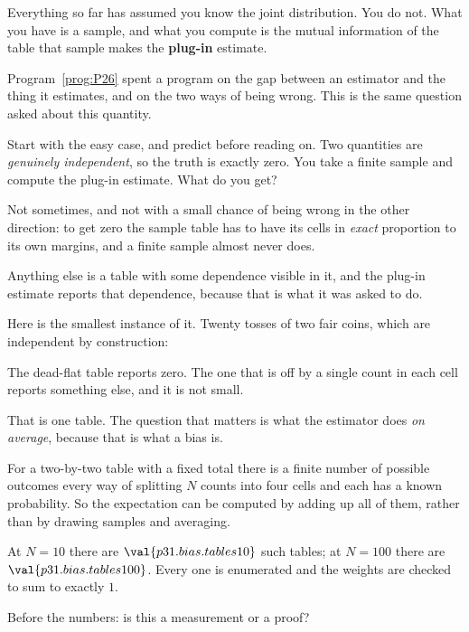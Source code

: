 \begin{fr}
Everything so far has assumed you know the joint distribution. You do not.
What you have is a sample, and what you compute is the mutual information of
the table that sample makes \dash{} the \textbf{plug-in} estimate.

Program~\ref{prog:P26} spent a program on the gap between an estimator and
the thing it estimates, and on the two ways of being wrong. This is the same
question asked about this quantity.

Start with the easy case, and predict before reading on. Two quantities are
\emph{genuinely independent}, so the truth is exactly zero. You take a finite
sample and compute the plug-in estimate. What do you get?
\dotline
\nextframe
\end{fr}

\begin{fr}

Not sometimes, and not with a small chance of being wrong in the other
direction: to get zero the sample table has to have its cells in \emph{exact}
proportion to its own margins, and a finite sample almost never does.

Anything else is a table with some dependence visible in it, and the plug-in
estimate reports that dependence, because that is what it was asked to do.

Here is the smallest instance of it. Twenty tosses of two fair coins, which
are independent by construction:


The dead-flat table reports zero. The one that is off by a single count in
each cell reports something else, and it is not small.
\end{fr}

\begin{fr}
That is one table. The question that matters is what the estimator does
\emph{on average}, because that is what a bias is.

For a two-by-two table with a fixed total there is a finite number of
possible outcomes \dash{} every way of splitting $N$ counts into four cells
\dash{} and each has a known probability. So the expectation can be computed
by adding up all of them, rather than by drawing samples and averaging.

At $N = 10$ there are $\val{p31.bias.tables10}$ such tables; at $N = 100$
there are $\val{p31.bias.tables100}$. Every one is enumerated and the
weights are checked to sum to exactly $1$.

Before the numbers: is this a measurement or a proof?
\dotline
\nextframe
\end{fr}

